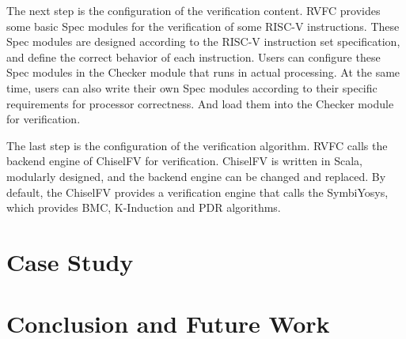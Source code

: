 \documentclass[conference]{IEEEtran}
\theoremstyle{definition}
\begin{document}
The next step is the configuration of the verification content.
RVFC provides some basic Spec modules for the verification of some RISC-V instructions.
These Spec modules are designed according to the RISC-V instruction set specification, and define the correct behavior of each instruction.
Users can configure these Spec modules in the Checker module that runs in actual processing.
At the same time, users can also write their own Spec modules according to their specific requirements for processor correctness.
And load them into the Checker module for verification.

The last step is the configuration of the verification algorithm.
RVFC calls the backend engine of ChiselFV for verification. ChiselFV is written in Scala, modularly designed, and the backend engine can be changed and replaced.
By default, the ChiselFV provides a verification engine that calls the SymbiYosys, which provides BMC, K-Induction and PDR algorithms.


\section{Case Study}

\section{Conclusion and Future Work}



\end{document}
